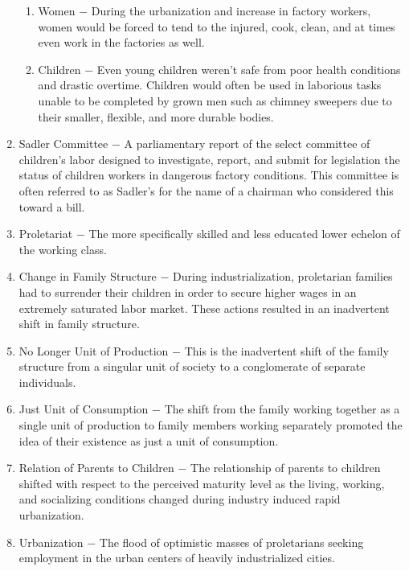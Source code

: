 \documentclass[12pt]{article}
\begin{document}
\begin{enumerate}
\begin{enumerate}[label=\arabic{*}.]
\item Women $-$ During the urbanization and increase in factory workers, women would be forced to tend to the injured, cook, clean, and at times even work in the factories as well.

\item Children $-$ Even young children weren't safe from poor health conditions and drastic overtime. Children would often be used in laborious tasks unable to be completed by grown men such as chimney sweepers due to their smaller, flexible, and more durable bodies.

\end{enumerate}
\setcounter{enumi}{391}

\item Sadler Committee $-$ A parliamentary report of the select committee of children's labor designed to investigate, report, and submit for legislation the status of children workers in dangerous factory conditions. This committee is often referred to as Sadler's for the name of a chairman who considered this toward a bill.

\item Proletariat $-$ The more specifically skilled and less educated lower echelon of the working class. 

\item Change in Family Structure $-$ During industrialization, proletarian families had to surrender their children in order to secure higher wages in an extremely saturated labor market. These actions resulted in an inadvertent shift in family structure.

\item No Longer Unit of Production $-$ This is the inadvertent shift of the family structure from a singular unit of society to a conglomerate of separate individuals. 

\item Just Unit of Consumption $-$ The shift from the family working together as a single unit of production to family members working separately promoted the idea of their existence as just a unit of consumption.

\item Relation of Parents to Children $-$ The relationship of parents to children shifted with respect to the perceived maturity level as the living, working, and socializing conditions changed during industry induced rapid urbanization.

\item Urbanization $-$ The flood of optimistic masses of proletarians seeking employment in the urban centers of heavily industrialized cities. 


\end{enumerate}
\end{document}
